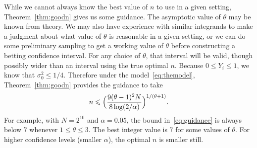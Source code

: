 \documentclass{article}
\newcommand{\art}[1]{\begingroup\color{blue}#1\endgroup}
\renewcommand{\le}{\leqslant}
\begin{document}
\art{While we cannot always know the best value of $n$ to use
in a given setting, Theorem~\ref{thm:goodn} gives us some guidance.
The asymptotic value of $\theta$ may be known from theory.
We may also have experience with similar integrands to make a
judgment about what value of $\theta$ is reasonable in a given
setting, or we can do some preliminary sampling to get a working
value of $\theta$ before constructing a betting confidence interval.
For any choice of $\theta$, that interval will be valid, though possibly 
wider than an interval using the true optimal $n$.
Because $0\le Y_i\le1$, we know that $\sigma_0^2\le 1/4$. Therefore
under the model~\eqref{eq:themodel}, Theorem~\ref{thm:goodn}
provides the guidance to take
\begin{align}\label{eq:guidance}
n\le \Bigl(\frac{9(\theta-1)^2N}{8\log(2/\alpha)}\Bigr)^{1/(\theta+1)}.
\end{align}
For example, with $N=2^{10}$ and $\alpha=0.05$, the bound in~\eqref{eq:guidance}
is always below $7$ whenever $1\le\theta\le3$. The best integer
value is $7$ for some values of $\theta$.
For higher confidence levels (smaller $\alpha$), the optimal
$n$ is smaller still.
}
\end{document}
